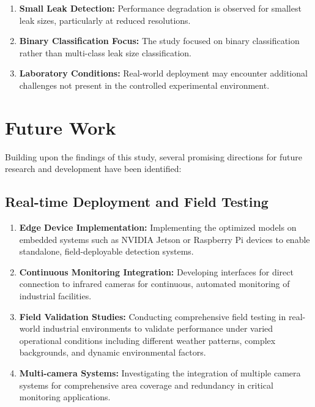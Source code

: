 \begin{enumerate}
\item \textbf{Small Leak Detection:} Performance degradation is observed for smallest leak sizes, particularly at reduced resolutions.

\item \textbf{Binary Classification Focus:} The study focused on binary classification rather than multi-class leak size classification.

\item \textbf{Laboratory Conditions:} Real-world deployment may encounter additional challenges not present in the controlled experimental environment.
\end{enumerate}

\section{Future Work}

Building upon the findings of this study, several promising directions for future research and development have been identified:

\subsection{Real-time Deployment and Field Testing}

\begin{enumerate}
\item \textbf{Edge Device Implementation:} Implementing the optimized models on embedded systems such as NVIDIA Jetson or Raspberry Pi devices to enable standalone, field-deployable detection systems.

\item \textbf{Continuous Monitoring Integration:} Developing interfaces for direct connection to infrared cameras for continuous, automated monitoring of industrial facilities.

\item \textbf{Field Validation Studies:} Conducting comprehensive field testing in real-world industrial environments to validate performance under varied operational conditions including different weather patterns, complex backgrounds, and dynamic environmental factors.

\item \textbf{Multi-camera Systems:} Investigating the integration of multiple camera systems for comprehensive area coverage and redundancy in critical monitoring applications.
\end{enumerate}

